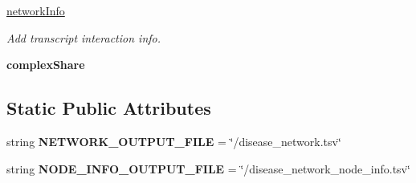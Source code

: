 \begin{DoxyCompactItemize}
\item 
\hyperlink{classsrc_1_1fr_1_1tagc_1_1rainet_1_1core_1_1execution_1_1analysis_1_1EnrichmentAnalysis_1_1Prepadc28f54f950771e5293b3cf9082b7c77_a95590609d0ba5814a33ceec5a91ba37e}{network\-Info}
\begin{DoxyCompactList}\small\item\em Add transcript interaction info. \end{DoxyCompactList}\item 
\hypertarget{classsrc_1_1fr_1_1tagc_1_1rainet_1_1core_1_1execution_1_1analysis_1_1EnrichmentAnalysis_1_1Prepadc28f54f950771e5293b3cf9082b7c77_a86fc0ddec1cf3c012d3e40a459c710bc}{{\bfseries complex\-Share}}\label{classsrc_1_1fr_1_1tagc_1_1rainet_1_1core_1_1execution_1_1analysis_1_1EnrichmentAnalysis_1_1Prepadc28f54f950771e5293b3cf9082b7c77_a86fc0ddec1cf3c012d3e40a459c710bc}

\end{DoxyCompactItemize}
\subsection*{Static Public Attributes}
\begin{DoxyCompactItemize}
\item 
\hypertarget{classsrc_1_1fr_1_1tagc_1_1rainet_1_1core_1_1execution_1_1analysis_1_1EnrichmentAnalysis_1_1Prepadc28f54f950771e5293b3cf9082b7c77_a3bf3de1cff0371e53025f7c69becd609}{string {\bfseries N\-E\-T\-W\-O\-R\-K\-\_\-\-O\-U\-T\-P\-U\-T\-\_\-\-F\-I\-L\-E} = \char`\"{}/disease\-\_\-network.\-tsv\char`\"{}}\label{classsrc_1_1fr_1_1tagc_1_1rainet_1_1core_1_1execution_1_1analysis_1_1EnrichmentAnalysis_1_1Prepadc28f54f950771e5293b3cf9082b7c77_a3bf3de1cff0371e53025f7c69becd609}

\item 
\hypertarget{classsrc_1_1fr_1_1tagc_1_1rainet_1_1core_1_1execution_1_1analysis_1_1EnrichmentAnalysis_1_1Prepadc28f54f950771e5293b3cf9082b7c77_a386ca9597eb7c07034f0d5924f8bb6ae}{string {\bfseries N\-O\-D\-E\-\_\-\-I\-N\-F\-O\-\_\-\-O\-U\-T\-P\-U\-T\-\_\-\-F\-I\-L\-E} = \char`\"{}/disease\-\_\-network\-\_\-node\-\_\-info.\-tsv\char`\"{}}\label{classsrc_1_1fr_1_1tagc_1_1rainet_1_1core_1_1execution_1_1analysis_1_1EnrichmentAnalysis_1_1Prepadc28f54f950771e5293b3cf9082b7c77_a386ca9597eb7c07034f0d5924f8bb6ae}

\end{DoxyCompactItemize}



